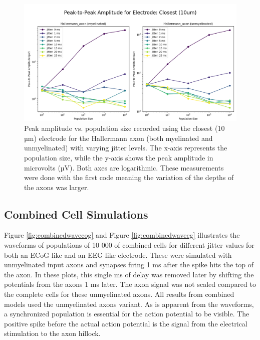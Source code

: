 \documentclass[final, a4paper,masters,en,listoffigures,listoftables,norwegiandates]{NMBU}
\begin{document}
\begin{figure}[htbp]
    \centering
    \includegraphics[width=\linewidth]{Figures/AxonDistancesPeakAmpECoG.png}
    \caption{Peak amplitude vs. population size recorded using the closest (10 µm) electrode for the Hallermann axon (both myelinated and unmyelinated) with varying jitter levels. The x-axis represents the population size, while the y-axis shows the peak amplitude in microvolts (µV). Both axes are logarithmic. These measurements were done with the first code meaning the variation of the depths of the axons was larger.}
    \label{fig:AxonDistancesPeakAmpECoG}
\end{figure}

\subsection{Combined Cell Simulations}
Figure \ref{fig:combinedwavecog} and Figure \ref{fig:combinedwaveeg} illustrates the waveforms of populations of 10 000 of combined cells for different jitter values for both an ECoG-like and an EEG-like electrode. These were simulated with unmyelinated input axons and synapses firing 1 ms after the spike hits the top of the axon. In these plots, this single ms of delay was removed later by shifting the potentials from the axons 1 ms later. The axon signal was not scaled compared to the complete cells for these unmyelinated axons. All results from combined models used the unmyelinated axons variant. As is apparent from the waveforms, a synchronized population is essential for the action potential to be visible. The positive spike before the actual action potential is the signal from the electrical stimulation to the axon hillock. 
\end{document}

